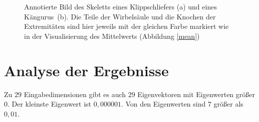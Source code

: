  \begin{figure}[ht]
  \qquad
  
  \caption{Annotierte Bild des Skeletts eines Klippschliefers (a) und eines \mbox{Kängurus (b)}. Die Teile der Wirbelsäule und die Knochen der Extremitäten sind hier jeweils mit der gleichen Farbe markiert wie in der Visualisierung des Mittelwerts (Abbildung \ref{mean})}
 \end{figure}
 

 \newpage
 \section{Analyse der Ergebnisse}
 \label{section_pca_result_analysis}
 
 Zu $29$ Eingabedimensionen gibt es auch $29$ Eigenvektoren mit Eigenwerten größer $0$. Der kleinste Eigenwert ist $0{,}000001$. Von den Eigenwerten sind $7$ größer als $0{,}01$. 
 
